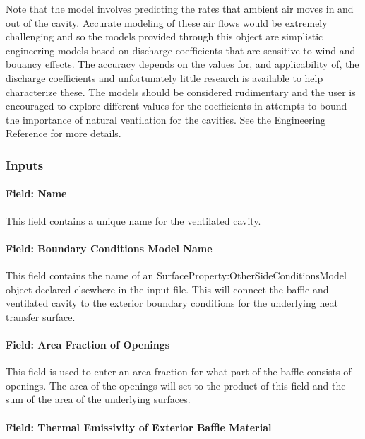 Note that the model involves predicting the rates that ambient air moves in and out of the cavity. Accurate modeling of these air flows would be extremely challenging and so the models provided through this object are simplistic engineering models based on discharge coefficients that are sensitive to wind and bouancy effects. The accuracy depends on the values for, and applicability of, the discharge coefficients and unfortunately little research is available to help characterize these. The models should be considered rudimentary and the user is encouraged to explore different values for the coefficients in attempts to bound the importance of natural ventilation for the cavities. See the Engineering Reference for more details.

\subsubsection{Inputs}\label{inputs-13}

\paragraph{Field: Name}\label{field-name-9}

This field contains a unique name for the ventilated cavity.

\paragraph{Field: Boundary Conditions Model Name}\label{field-boundary-conditions-model-name}

This field contains the name of an SurfaceProperty:OtherSideConditionsModel object declared elsewhere in the input file. This will connect the baffle and ventilated cavity to the exterior boundary conditions for the underlying heat transfer surface.

\paragraph{Field: Area Fraction of Openings}\label{field-area-fraction-of-openings}

This field is used to enter an area fraction for what part of the baffle consists of openings. The area of the openings will set to the product of this field and the sum of the area of the underlying surfaces.

\paragraph{Field: Thermal Emissivity of Exterior Baffle Material}\label{field-thermal-emissivity-of-exterior-baffle-material}

